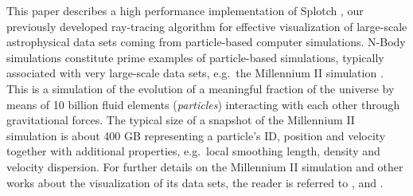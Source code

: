 \documentclass[1p,times]{elsarticle}
\begin{document}
%

This paper describes a high performance implementation of 
Splotch \citep{2008NJPh...10l5006D}, our previously developed ray-tracing 
algorithm for effective visualization of large-scale astrophysical data sets coming 
from particle-based computer simulations. N-Body simulations constitute 
prime examples of particle-based simulations, typically associated with very 
large-scale data sets, e.g.\ the Millennium II simulation \citep{2009MNRAS.398.1150B}.
This is a simulation of the evolution of a meaningful fraction of the universe 
by means of 10 billion fluid elements ({\it particles}) interacting with each other 
through gravitational forces. The typical size of a snapshot of the Millennium II 
simulation is about 400 GB representing a particle's ID, position and velocity
together with additional properties, e.g.\ local smoothing length, density and 
velocity dispersion. For further details on the Millennium II simulation and
other works about the visualization of its data sets, the reader
is referred to \citep{2009MNRAS.398.1150B}, \cite{fraedrich2009} and \cite{Szalay2008}.
\end{document}
